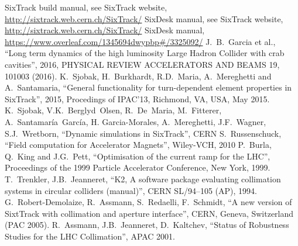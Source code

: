 \begin{thebibliography}{99}
        SixTrack build manual, see SixTrack website, \url{http://sixtrack.web.cern.ch/SixTrack/}
        SixDesk manual, see SixTrack website, \url{http://sixtrack.web.cern.ch/SixTrack/}
        SixDesk manual, \url{https://www.overleaf.com/1345694dwypbp#/3325092/}
        J.~B.~Garcia et al.,
        ``Long term dynamics of the high luminosity Large Hadron Collider with crab cavities'',
        2016, PHYSICAL REVIEW ACCELERATORS AND BEAMS 19, 101003 (2016).
        K.~Sjobak, H.~Burkhardt, R.D.~Maria, A.~Mereghetti and A.~Santamaria,
        ``General functionality for turn-dependent element properties in SixTrack'',
        2015, Procedings of IPAC'13, Richmond, VA, USA, May 2015.
        K.~Sjobak, V.K.~Berglyd~Olsen, R.~De~Maria, M.~Fitterer, A.~Santamaría~García, H. Garcia-Morales, A.~Mereghetti, J.F.~Wagner, S.J.~Wretborn,
        ``Dynamic simulations in SixTrack'',
        CERN
        S.~Russenschuck,
        ``Field computation for Accelerator Magnets'',
        Wiley-VCH, 2010
        P.~Burla, Q.~King and J.G.~Pett,
        ``Optimisation of the current ramp for the LHC'',
        Proceedings of the 1999 Particle Accelerator Conference, New York, 1999.
        T.~Trenkler, J.B.~Jeanneret,
        ``K2, A software package evaluating collimation systems in circular colliders (manual)'',
        CERN SL/94–105 (AP), 1994.
        G.~Robert-Demolaize, R.~Assmann, S.~Redaelli, F.~Schmidt,
        ``A new version of SixtTrack with collimation and aperture interface'',
        CERN, Geneva, Switzerland (PAC 2005).
        R.~Assmann, J.B.~Jeanneret, D.~Kaltchev,
        ``Status of Robustness Studies for the LHC Collimation'',
        APAC 2001.
\end{thebibliography}
